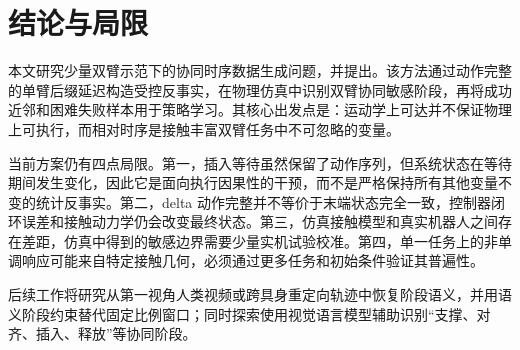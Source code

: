 \section{结论与局限}

本文研究少量双臂示范下的协同时序数据生成问题，并提出\method{}。该方法通过动作完整的单臂后缀延迟构造受控反事实，在物理仿真中识别双臂协同敏感阶段，再将成功近邻和困难失败样本用于策略学习。其核心出发点是：运动学上可达并不保证物理上可执行，而相对时序是接触丰富双臂任务中不可忽略的变量。

当前方案仍有四点局限。第一，插入等待虽然保留了动作序列，但系统状态在等待期间发生变化，因此它是面向执行因果性的干预，而不是严格保持所有其他变量不变的统计反事实。第二，delta 动作完整并不等价于末端状态完全一致，控制器闭环误差和接触动力学仍会改变最终状态。第三，仿真接触模型和真实机器人之间存在差距，仿真中得到的敏感边界需要少量实机试验校准。第四，单一任务上的非单调响应可能来自特定接触几何，必须通过更多任务和初始条件验证其普遍性。

后续工作将研究从第一视角人类视频或跨具身重定向轨迹中恢复阶段语义，并用语义阶段约束替代固定比例窗口；同时探索使用视觉语言模型辅助识别“支撑、对齐、插入、释放”等协同阶段。
